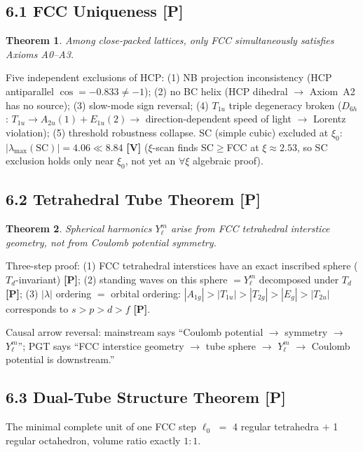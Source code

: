 \documentclass[11pt,a4paper]{article}
\newtheorem{theorem}{Theorem}[section]
\newcommand{\gradeP}{\textbf{[P]}}
\newcommand{\gradeV}{\textbf{[V]}}
\begin{document}
\subsection{6.1 FCC Uniqueness \gradeP}

\begin{theorem}
Among close-packed lattices, only FCC simultaneously satisfies Axioms A0--A3.
\end{theorem}

Five independent exclusions of HCP: (1) NB projection inconsistency (HCP antiparallel $\cos=-0.833\neq-1$); (2) no BC helix (HCP dihedral $\to$ Axiom~A2 has no source); (3) slow-mode sign reversal; (4) $T_{1u}$ triple degeneracy broken ($D_{6h}$: $T_{1u}\to A_{2u}(1)+E_{1u}(2)\to$ direction-dependent speed of light $\to$ Lorentz violation); (5) threshold robustness collapse. SC (simple cubic) excluded at $\xi_0$: $|\lambda_{\max}(\mathrm{SC})|=4.06\ll 8.84$ \gradeV{} ($\xi$-scan finds SC$\geq$FCC at $\xi\approx 2.53$, so SC exclusion holds only near $\xi_0$, not yet an $\forall\xi$ algebraic proof).

\subsection{6.2 Tetrahedral Tube Theorem \gradeP}

\begin{theorem}
Spherical harmonics $Y_\ell^m$ arise from FCC tetrahedral interstice geometry, not from Coulomb potential symmetry.
\end{theorem}

Three-step proof: (1) FCC tetrahedral interstices have an exact inscribed sphere ($T_d$-invariant) \gradeP; (2) standing waves on this sphere $= Y_\ell^m$ decomposed under $T_d$ \gradeP; (3) $|\lambda|$ ordering $=$ orbital ordering: $|A_{1g}|>|T_{1u}|>|T_{2g}|>|E_g|>|T_{2u}|$ corresponds to $s>p>d>f$ \gradeP.

Causal arrow reversal: mainstream says ``Coulomb potential $\to$ symmetry $\to$ $Y_\ell^m$''; PGT says ``FCC interstice geometry $\to$ tube sphere $\to$ $Y_\ell^m$ $\to$ Coulomb potential is downstream.''

\subsection{6.3 Dual-Tube Structure Theorem \gradeP}

The minimal complete unit of one FCC step $\ell_0$ $=$ 4 regular tetrahedra $+$ 1 regular octahedron, volume ratio exactly $1:1$.
\end{document}
